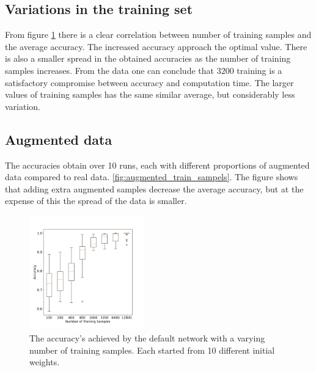 \documentclass[prl,twocolumn]{revtex4-1}
\begin{document}
\subsection{Variations in the training set}

From figure \ref{fig:num_train_samples} there is a clear correlation between number of training samples and the average accuracy. The increased accuracy approach the optimal value. There is also a smaller spread in the obtained accuracies as the number of training samples increases. From the data one can conclude that $3200$ training is a satisfactory compromise between accuracy and computation time. The larger values of training samples has the same similar average, but considerably less variation. 


\subsection{Augmented data}
The accuracies obtain over 10 runs, each with different proportions of augmented data compared to real data. \ref{fig:augmented_train_sampels}. The figure shows that adding extra augmented samples decrease the average accuracy, but at the expense of this the spread of the data is smaller.


\begin{figure}[ht]
  \includegraphics[width=0.44\textwidth]{task_1/num_train_box_30.pdf}
  \caption{The accuracy's achieved by the default network with a varying number of training samples. Each started from 10 different initial weights.}
  \label{fig:num_train_samples}
\end{figure}
\end{document}
